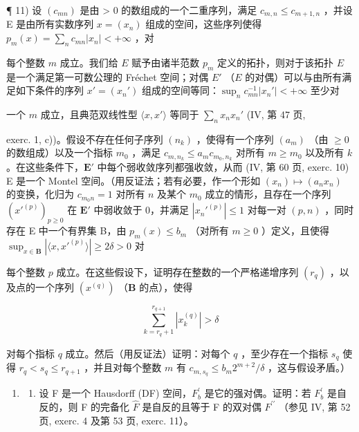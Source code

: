 ¶ 11) 设 \((c_{mn})\) 是由 \textgreater{} 0 的数组成的一个二重序列，满足 \(c_{m,n} \leqslant c_{m+1,n}\) ，并设 E 是由所有实数序列 \(x = (x_n)\) 组成的空间，这些序列使得 \(p_m(x) = \sum_n c_{mn} |x_n| < +\infty\) ，对

每个整数 \(m\) 成立。我们给 \(E\) 赋予由诸半范数 \(p_m\) 定义的拓扑，则对于该拓扑 \(E\) 是一个满足第一可数公理的 Fréchet 空间；对偶 \(E'\) （\(E\) 的对偶）可以与由所有满足如下条件的序列 \(x' = (x_n')\) 组成的空间等同：\(\sup_{n} c_{mn}^{-1} |x_n'| < +\infty\) 至少对

一个 \(m\) 成立，且典范双线性型 \(\langle x, x' \rangle\) 等同于 \(\sum_{n} x_n x_n'\) (IV, 第 47 页,

exerc. 1, c))。假设不存在任何子序列 \((n_k)\) ，使得有一个序列 \((a_m)\) （由 \(\geqslant 0\) 的数组成）以及一个指标 \(m_0\) ，满足 \(c_{m,n_k} \leqslant a_m c_{m_0,n_k}\) 对所有 \(m \geqslant m_0\) 以及所有 \(k\) 。在这些条件下，\(\mathbf{E}'\) 中每个弱收敛序列都强收敛，从而 (IV, 第 60 页, exerc. 10) E 是一个 Montel 空间。（用反证法；若有必要，作一个形如 \((x_n) \mapsto (a_n x_n)\) 的变换，化归为 \(c_{m_0 n} = 1\) 对所有 \(n\) 及某个 \(m_0\) 成立的情形，且存在一个序列 \((x'^{(p)})_{p \geqslant 0}\) 在 \(\mathbf{E}'\) 中弱收敛于 0，并满足 \(|x_n'^{(p)}| \leqslant 1\) 对每一对 \((p, n)\) ，同时存在 E 中一个有界集 B，由 \(p_m(x) \leqslant b_m\) （对所有 \(m \geqslant 0\) ）定义，且使得 \(\sup_{x \in \mathbf{B}} |\langle x, x'^{(p)} \rangle| \geqslant 2\delta > 0\) 对

每个整数 \(p\) 成立。在这些假设下，证明存在整数的一个严格递增序列 \((r_q)\) ，以及点的一个序列 \((x^{(q)})\) （\(\mathbf{B}\) 的点），使得

\[
\sum_ {k = r _ {q} + 1} ^ {r _ {q+1}} \left| x _ {k} ^ {(q)} \right| > \delta
\]

对每个指标 \(q\) 成立。然后（用反证法）证明：对每个 \(q\) ，至少存在一个指标 \(s_q\) 使得 \(r_q < s_q \leqslant r_{q+1}\) ，并且对每个整数 \(m\) 有 \(c_{m,s_q} \leqslant b_m 2^{m+2}/\delta\) ，这与假设矛盾。）

\begin{enumerate}
\def\labelenumi{\arabic{enumi})}
\setcounter{enumi}{11}
\tightlist
\item
  \begin{enumerate}
  \def\labelenumii{\alph{enumii})}
  \tightlist
  \item
    设 F 是一个 Hausdorff (DF) 空间，\(F_{b}^{\prime}\) 是它的强对偶。证明：若 \(F_{b}^{\prime}\) 是自反的，则 F 的完备化 \(\hat{F}\) 是自反的且等于 F 的双对偶 \(F^{\prime\prime}\) （参见 IV, 第 52 页, exerc. 4 及第 53 页, exerc. 11）。
  \end{enumerate}
\end{enumerate}

